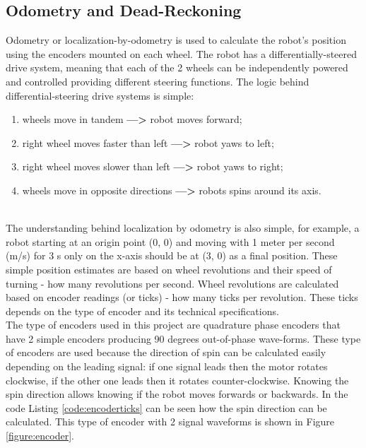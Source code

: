 \subsection{Odometry and Dead-Reckoning}

Odometry or localization-by-odometry is used to calculate the robot's position using the encoders mounted on each wheel. The robot has a differentially-steered drive system, meaning that each of the 2 wheels can be independently powered and controlled providing different steering functions. \cite{robotics}
The logic behind differential-steering drive systems is simple:


\begin{enumerate}
    \item wheels move in tandem \textbf{--->} robot moves forward;
    \item right wheel moves faster than left \textbf{--->} robot yaws to left;
    \item right wheel moves slower than left \textbf{--->} robot yaws to right;
    \item wheels move in opposite directions \textbf{--->} robots spins around its axis.
\end{enumerate}
\\

The understanding behind localization by odometry is also simple, for example, a robot starting at an origin point (0, 0) and moving with 1 meter per second (m/s) for 3 s only on the x-axis should be at (3, 0) as a final position. \cite{mit} These simple position estimates are based on wheel revolutions and their speed of turning - how many revolutions per second. Wheel revolutions are calculated based on encoder readings (or ticks) - how many ticks per revolution. These ticks depends on the type of encoder and its technical specifications.\\

The type of encoders used in this project are quadrature phase encoders that have 2 simple encoders producing 90 degrees out-of-phase wave-forms. These type of encoders are used because the direction of spin can be calculated easily depending on the leading signal: if one signal leads then the motor rotates clockwise, if the other one leads then it rotates counter-clockwise. Knowing the spin direction allows knowing if the robot moves forwards or backwards. In the code Listing \ref{code:encoderticks} can be seen how the spin direction can be calculated. This type of encoder with 2 signal waveforms is shown in Figure \ref{figure:encoder}.

